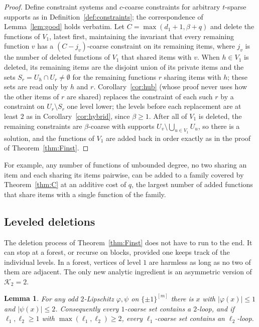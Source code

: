\documentclass[11pt,letterpaper]{article}
\newtheorem{lemma}[theorem]{Lemma}
\theoremstyle{definition}
\newcommand{\cube}[1]{\{\pm1\}^{#1}}
\begin{document}
\begin{proof}
Define constraint systems and $c$-coarse constraints for arbitrary $t$-sparse supports as in
Definition~\ref{def:constraints}; the correspondence of Lemma~\ref{lem:good} holds verbatim. Let
$C=\max(d_1+1,\beta+q)$ and delete the functions of $V_1$, latest first, maintaining the invariant
that every remaining function $v$ has a $(C-j_v)$-coarse constraint on its remaining items, where
$j_v$ is the number of deleted functions of $V_1$ that shared items with $v$. When $h\in V_1$ is
deleted, its remaining items are the disjoint union of its private items and the sets
$S_r=U_h\cap U_r\ne\emptyset$ for the remaining functions $r$ sharing items with $h$; these sets are
read only by $h$ and $r$. Corollary~\ref{cor:hub} (whose proof never uses how the other items of
$r$ are shared) replaces the constraint of each such $r$ by a constraint on $U_r\setminus S_r$ one
level lower; the levels before each replacement are at least $2$ as in
Corollary~\ref{cor:hybrid}, since $\beta\ge1$. After all of $V_1$ is deleted, the remaining
constraints are $\beta$-coarse with supports $U_v\setminus\bigcup_{u\in V_1}U_u$, so there is a
solution, and the functions of $V_1$ are added back in order exactly as in the proof of
Theorem~\ref{thm:Finst}.
\end{proof}

For example, any number of functions of unbounded degree, no two sharing an item and each sharing
its items pairwise, can be added to a family covered by Theorem~\ref{thm:C} at an additive cost of
$q$, the largest number of added functions that share items with a single function of the family.

\subsection{Leveled deletions}\label{sec:leveled}

The deletion process of Theorem~\ref{thm:Finst} does not have to run to the end. It can stop at a
forest, or recurse on blocks, provided one keeps track of the individual levels. In a forest,
vertices of level $1$ are harmless as long as no two of them are adjacent. The only new analytic ingredient is an
asymmetric version of $\mathcal{K}_2=2$.

\begin{lemma}\label{lem:K12lv}
For any odd $2$-Lipschitz $\varphi,\psi$ on $\cube{[m]}$ there is $x$ with $|\varphi(x)|\le1$ and
$|\psi(x)|\le2$. Consequently every $1$-coarse set contains a $2$-loop, and if
$\ell_1,\ell_2\ge1$ with $\max(\ell_1,\ell_2)\ge2$, every $\ell_1$-coarse set contains an
$\ell_2$-loop.
\end{lemma}
\end{document}
